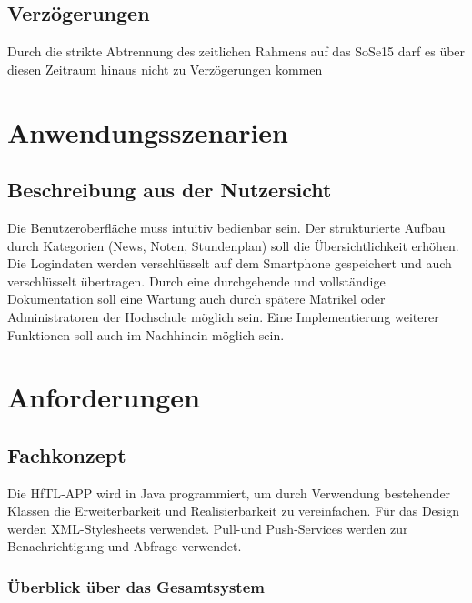 \subsection{\textbf{Verzögerungen}}

Durch die strikte Abtrennung des zeitlichen Rahmens auf das \acs{SoSe15} darf es über diesen Zeitraum hinaus nicht zu Verzögerungen kommen

\section{Anwendungsszenarien}

\subsection{\textbf{Beschreibung aus der Nutzersicht}}

Die Benutzeroberfläche muss intuitiv bedienbar sein. Der strukturierte Aufbau durch Kategorien (News, Noten, Stundenplan) soll die Übersichtlichkeit erhöhen.
Die Logindaten werden verschlüsselt auf dem Smartphone gespeichert und auch verschlüsselt übertragen.
Durch eine durchgehende und vollständige Dokumentation soll eine Wartung auch durch spätere Matrikel oder Administratoren der Hochschule möglich sein.
Eine Implementierung weiterer Funktionen soll auch im Nachhinein möglich sein.

\section{Anforderungen}

\subsection{\textbf{Fachkonzept}}
Die \acs{HfTL}-APP  wird in Java programmiert, um durch Verwendung bestehender Klassen die Erweiterbarkeit und Realisierbarkeit zu vereinfachen. Für das Design werden \acs{XML}-Stylesheets verwendet.
Pull-und Push-Services werden zur Benachrichtigung und Abfrage verwendet.




\subsubsection{Überblick über das Gesamtsystem}
$\;$ \\ %

